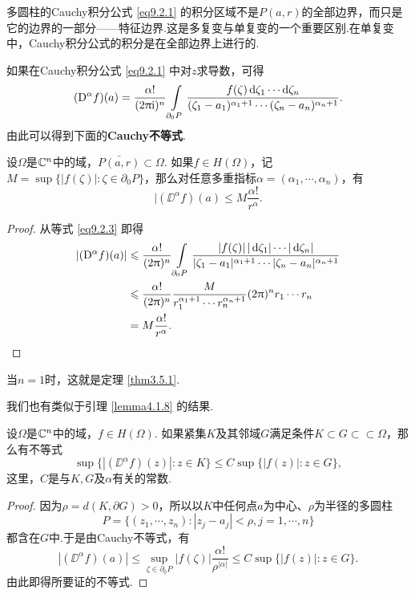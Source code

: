 多圆柱的Cauchy积分公式 \eqref{eq9.2.1} 的积分区域不是$P(a,r)$的全部边界，而只是它的边界的一部分——特征边界.这是多复变与单复变的一个重要区别.在单复变中，Cauchy积分公式的积分是在全部边界上进行的.

如果在Cauchy积分公式 \eqref{eq9.2.1} 中对$z$求导数，可得
\begin{equation}\label{eq9.2.3}
(\mathrm D^\alpha f)(a)=\frac{\alpha!}{(2\uppi\mathrm i)^n}
\int\limits_{\partial_0P}
\frac{f(\zeta)\mathop{}\!\mathrm{d} \zeta_1\cdots\mathop{}\!\mathrm{d} \zeta_n}{(\zeta_1-a_1)^{\alpha_1+1}\cdots(\zeta_n-a_n)^{\alpha_n+1}}.
\end{equation}
由此可以得到下面的\textbf{Cauchy不等式}.
\begin{theorem}\label{thm9.2.2}
设$\Omega$是$\mathbb C^n$中的域，$\bar{P(a,r)}\subset\Omega$. 如果$f\in H(\Omega)$，记$M=\sup\{|f(\zeta)|:\zeta\in\partial_0P\}$，那么对任意多重指标$\alpha=(\alpha_1,\cdots,\alpha_n)$，有
\[|(\DD^\alpha f)(a)\le M\frac{\alpha!}{r^\alpha}.\]
\end{theorem}
\begin{proof}
从等式 \eqref{eq9.2.3} 即得
\begin{align*}
  |(\mathrm D^\alpha f)(a)|&\leqslant\frac{\alpha!}{(2\uppi)^n}
  \int\limits_{\partial_0P}
  \frac{|f(\zeta)|\,|\mathop{}\!\mathrm{d} \zeta_1|\cdots|\mathop{}\!\mathrm{d} \zeta_n|}{|\zeta_1-a_1|^{\alpha_1+1}\cdots|\zeta_n-a_n|^{\alpha_n+1}}\\
  & \leqslant \frac{\alpha!}{(2\uppi)^n}\frac M{r_1^{\alpha_1+1}\cdots r_n^{\alpha_n+1}} (2\uppi)^nr_1\cdots r_n\\
  & = M\frac{\alpha!}{r^\alpha}. \qedhere
\end{align*}
\end{proof}

当$n=1$时，这就是定理 \ref{thm3.5.1}.

我们也有类似于引理 \ref{lemma4.1.8} 的结果.
\begin{theorem}\label{thm9.2.3}
设$\Omega$是$\mathbb C^n$中的域，$f\in H(\Omega)$. 如果紧集$K$及其邻域$G$满足条件$K\subset G\subset\subset \Omega$，那么有不等式
\[\sup\{|(\DD^\alpha f)(z)|:z\in K\}\le C\sup\{|f(z)|:z\in G\},\]
这里，$C$是与$K,G$及$\alpha$有关的常数.
\end{theorem}
\begin{proof}
因为$\rho=d(K,\partial G)>0$，所以以$K$中任何点$a$为中心、$\rho$为半径的多圆柱
\[P=\{(z_1,\cdots,z_n):|z_j-a_j|<\rho,j=1,\cdots,n\}\]
都含在$G$中.于是由Cauchy不等式，有
\[|(\DD^\alpha f)(a)|\le\sup_{\zeta\in\partial_0P}|f(\zeta)|\frac{\alpha!}{\rho^{|\alpha|}}
\le C\sup\{|f(z)|:z\in G\}.\]
由此即得所要证的不等式.
\end{proof}

